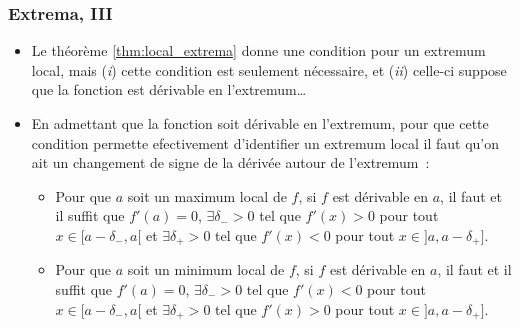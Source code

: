 \documentclass[10pt,notheorems]{beamer}
\theoremstyle{plain}
\theoremstyle{definition} %
\begin{document}
\begin{frame}
  \frametitle{Extrema, III}

  \begin{itemize}

  \item Le théorème \hyperlink{slide_extrema_2}{\ref{thm:local_extrema}} donne une condition pour un extremum local, mais (\textit{i}) cette condition est seulement nécessaire, et (\textit{ii}) celle-ci suppose que la fonction est dérivable en l'extremum\ldots\newline

  \item En admettant que la fonction soit dérivable en l'extremum, pour que cette condition permette efectivement d'identifier un extremum local il faut qu'on ait un changement de signe de la dérivée autour de l'extremum~:\newline

    \begin{itemize}

    \item Pour que $a$ soit un maximum local de $f$, si $f$ est dérivable en $a$, il faut et il suffit que $f'(a)=0$, $\exists \delta_->0$ tel que $f'(x)>0$ pour tout $x\in[a-\delta_-,a[$ et $\exists \delta_+>0$ tel que $f'(x)<0$ pour tout $x\in]a, a-\delta_+]$.\newline

    \item Pour que $a$ soit un minimum local de $f$, si $f$ est dérivable en $a$, il faut et il suffit que $f'(a)=0$, $\exists \delta_->0$ tel que $f'(x)<0$ pour tout $x\in[a-\delta_-,a[$ et $\exists \delta_+>0$ tel que $f'(x)>0$ pour tout $x\in]a, a-\delta_+]$.\newline

    \end{itemize}

  \end{itemize}

\end{frame}
\end{document}
